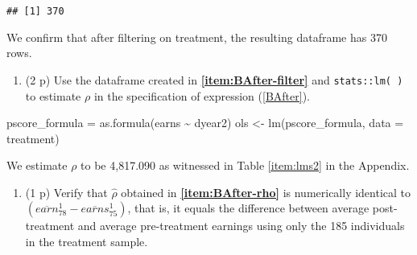 \documentclass[
]{article}
\newenvironment{Shaded}{\begin{snugshade}}{\end{snugshade}}
\newcommand{\AttributeTok}[1]{\textcolor[rgb]{0.77,0.63,0.00}{#1}}
\newcommand{\DecValTok}[1]{\textcolor[rgb]{0.00,0.00,0.81}{#1}}
\newcommand{\FunctionTok}[1]{\textcolor[rgb]{0.00,0.00,0.00}{#1}}
\newcommand{\NormalTok}[1]{#1}
\newcommand{\OtherTok}[1]{\textcolor[rgb]{0.56,0.35,0.01}{#1}}
\newcommand{\SpecialCharTok}[1]{\textcolor[rgb]{0.00,0.00,0.00}{#1}}
\providecommand{\tightlist}{%
  \setlength{\itemsep}{0pt}\setlength{\parskip}{0pt}}
\begin{document}
\begin{verbatim}
## [1] 370
\end{verbatim}

We confirm that after filtering on treatment, the resulting dataframe
has 370 rows.

\begin{enumerate}
\def\labelenumi{\alph{enumi}.}
\setcounter{enumi}{2}
\tightlist
\item
  (2 p) Use the dataframe created in \textbf{\ref{item:BAfter-filter}}
  and \texttt{stats::lm( )} to estimate \(\rho\) in the specification of
  expression (\ref{BAfter}).\label{item:BAfter-rho}
\end{enumerate}

\begin{Shaded}
\begin{Highlighting}[]
\NormalTok{pscore\_formula }\OtherTok{=} \FunctionTok{as.formula}\NormalTok{(earns }\SpecialCharTok{\textasciitilde{}}\NormalTok{ dyear2)}
\NormalTok{ols }\OtherTok{\textless{}{-}} \FunctionTok{lm}\NormalTok{(pscore\_formula, }\AttributeTok{data =}\NormalTok{ treatment)}
\end{Highlighting}
\end{Shaded}

We estimate \(\rho\) to be 4,817.090 as witnessed in Table
\ref{item:lms2} in the Appendix.

\newpage

\begin{enumerate}
\def\labelenumi{\alph{enumi}.}
\setcounter{enumi}{3}
\tightlist
\item
  (1 p) Verify that \(\hat{\rho}\) obtained in
  \textbf{\ref{item:BAfter-rho}} is numerically identical to
  \(\left( \overline{earn}_{78}^{1}-\overline{earns}_{75}^{1}\right)\),
  that is, it equals the difference between average post-treatment and
  average pre-treatment earnings using only the 185 individuals in the
  treatment sample.\label{item:BAfter-diff}
\end{enumerate}

\begin{Shaded}
\end{Shaded}
\end{document}
